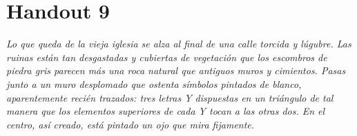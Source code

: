 \chapter{Handout 9}

\emph{Lo que queda de la vieja iglesia se alza al final de una calle torcida y
lúgubre. Las ruinas están tan desgastadas y cubiertas de vegetación que los
escombros de piedra gris parecen más una roca natural que antiguos muros y
cimientos. Pasas junto a un muro desplomado que ostenta símbolos pintados de
blanco, aparentemente recién trazados: tres letras Y dispuestas en un triángulo
de tal manera que los elementos superiores de cada Y tocan a las otras dos. En
el centro, así creado, está pintado un ojo que mira fijamente.}

